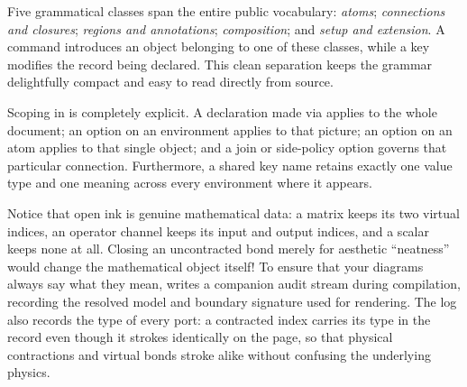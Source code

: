 Five grammatical classes span the entire public vocabulary: \emph{atoms};
\emph{connections and closures}; \emph{regions and annotations};
\emph{composition}; and \emph{setup and extension}.  A command introduces an
object belonging to one of these classes, while a key modifies the record being
declared.  This clean separation keeps the grammar delightfully compact and easy
to read directly from source.

Scoping in \pkg{} is completely explicit.  A declaration made via 
applies to the whole document; an option on an environment applies to that
picture; an option on an atom applies to that single object; and a join or
side-policy option governs that particular connection.  Furthermore, a shared
key name retains exactly one value type and one meaning across every
environment where it appears.

Notice that open ink is genuine mathematical data: a matrix keeps its two
virtual indices, an operator channel keeps its input and output indices, and a
scalar keeps none at all.  Closing an uncontracted bond merely for aesthetic
``neatness'' would change the mathematical object itself!  To ensure that your
diagrams always say what they mean, \pkg{} writes a companion 
audit stream during compilation, recording the resolved model and boundary
signature used for rendering.  The log also records the type of every port: a
contracted index carries its type in the record even though it strokes
identically on the page, so that physical contractions and virtual bonds stroke
alike without confusing the underlying physics.
